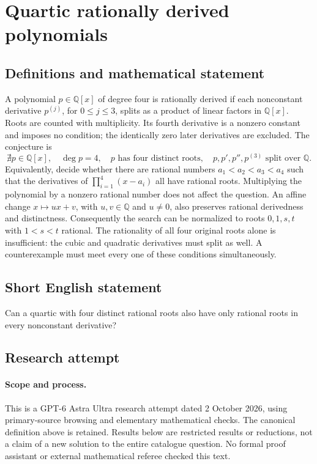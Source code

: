 \documentclass[11pt,a4paper]{article}
\begin{document}
\section*{Quartic rationally derived polynomials}\label{statement}

\subsection{Definitions and mathematical statement}
A polynomial $p\in\mathbb Q[x]$ of degree four is rationally derived if
each nonconstant derivative $p^{(j)}$, for $0\le j\le3$, splits as a
product of linear factors in $\mathbb Q[x]$. Roots are counted with
multiplicity. Its fourth derivative is a nonzero constant and imposes
no condition; the identically zero later derivatives are excluded.
The conjecture is
\[
 \nexists p\in\mathbb Q[x],\quad \deg p=4,
 \quad p\text{ has four distinct roots},
 \quad p,p',p'',p^{(3)}\text{ split over }\mathbb Q.
\]
Equivalently, decide whether there are rational numbers
$a_1<a_2<a_3<a_4$ such that the derivatives of
$\prod_{i=1}^4(x-a_i)$ all have rational roots. Multiplying the
polynomial by a nonzero rational number does not affect the question.
An affine change $x\mapsto ux+v$, with $u,v\in\mathbb Q$ and $u\ne0$,
also preserves rational derivedness and distinctness. Consequently the
search can be normalized to roots $0,1,s,t$ with $1<s<t$ rational.
The rationality of all four original roots alone is insufficient:
the cubic and quadratic derivatives must split as well. A counterexample
must meet every one of these conditions simultaneously.
\subsection{Short English statement}
Can a quartic with four distinct rational roots also have only rational roots in every nonconstant derivative?
\subsection{Research attempt}
\paragraph{Scope and process.}
This is a GPT-6 Astra Ultra research attempt dated 2 October 2026, using
primary-source browsing and elementary mathematical checks. The canonical
definition above is retained. Results below are restricted results or
reductions, not a claim of a new solution to the entire catalogue question.
No formal proof assistant or external mathematical referee checked this text.
\end{document}
